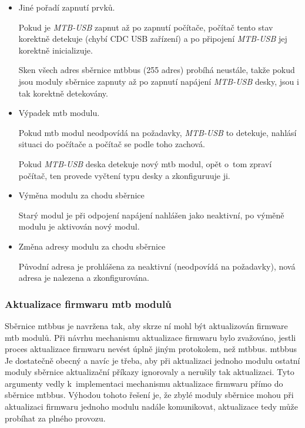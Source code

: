 \begin{itemize}
\item Jiné pořadí zapnutí prvků.

Pokud je \textit{MTB-USB} zapnut až po zapnutí počítače, počítač tento stav
korektně detekuje (chybí CDC USB zařízení) a po připojení \textit{MTB-USB} jej
korektně inicializuje.

Sken všech adres sběrnice \gls{mtbbus} (255 adres) probíhá neustále, takže
pokud jsou moduly sběrnice zapnuty až po zapnutí napájení \textit{MTB-USB} desky,
jsou i tak korektně detekovány.

\item Výpadek \gls{mtb} modulu.

Pokud \gls{mtb} modul neodpovídá na požadavky, \textit{MTB-USB} to detekuje, nahlásí
situaci do počítače a počítač se podle toho zachová.

Pokud \textit{MTB-USB} deska detekuje nový \gls{mtb} modul, opět o~tom zpraví
počítač, ten provede vyčtení typu desky a zkonfiguruuje ji.

\item Výměna modulu za chodu sběrnice

Starý modul je při odpojení napájení nahlášen jako neaktivní, po výměně modulu
je aktivován nový modul.

\item Změna adresy modulu za chodu sběrnice

Původní adresa je prohlášena za neaktivní (neodpovídá na požadavky), nová adresa
je nalezena a zkonfigurována.

\end{itemize}


\subsubsection{Aktualizace firmwaru \gls{mtb} modulů}

Sběrnice \gls{mtbbus} je navržena tak, aby skrze ní mohl být aktualizován
firmware \gls{mtb} modulů. Při návrhu mechanismu aktualizace firmwaru bylo
zvažováno, jestli proces aktualizace firmwaru nevést úplně jiným protokolem,
než \gls{mtbbus}. \gls{mtbbus} Je dostatečně obecný a navíc je třeba, aby
při aktualizaci jednoho modulu ostatní moduly sběrnice aktualizační příkazy
ignorovaly a nerušily tak aktualizaci. Tyto argumenty vedly k~implementaci
mechanismu aktualizace firmwaru přímo do sběrnice \gls{mtbbus}. Výhodou tohoto
řešení je, že zbylé moduly sběrnice mohou při aktualizaci firmwaru jednoho
modulu nadále komunikovat, aktualizace tedy může probíhat za plného provozu.

